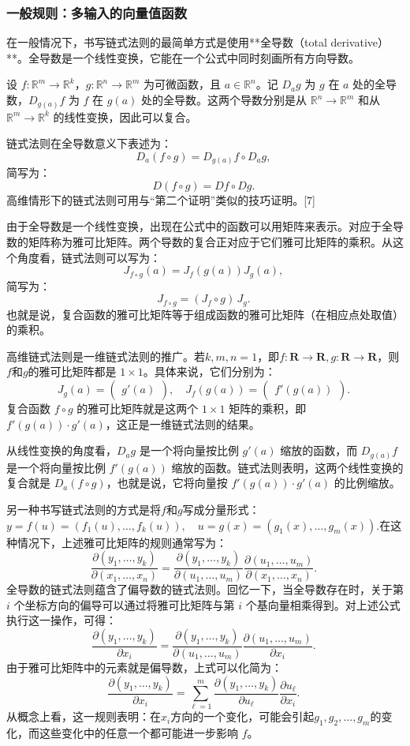 \subsubsection{一般规则：多输入的向量值函数}
在一般情况下，书写链式法则的最简单方式是使用**全导数（total derivative）**。全导数是一个线性变换，它能在一个公式中同时刻画所有方向导数。

设 $f: \mathbb{R}^m \to \mathbb{R}^k$，$g: \mathbb{R}^n \to \mathbb{R}^m$ 为可微函数，且 $a \in \mathbb{R}^n$。记 $D_a g$ 为 $g$ 在 $a$ 处的全导数，$D_{g(a)} f$ 为 $f$ 在 $g(a)$ 处的全导数。这两个导数分别是从 $\mathbb{R}^n \to \mathbb{R}^m$ 和从 $\mathbb{R}^m \to \mathbb{R}^k$ 的线性变换，因此可以复合。

链式法则在全导数意义下表述为：
$$
D_a(f \circ g) = D_{g(a)} f \circ D_a g,~
$$
简写为：
$$
D(f \circ g) = Df \circ Dg.~
$$
高维情形下的链式法则可用与“第二个证明”类似的技巧证明。[7]

由于全导数是一个线性变换，出现在公式中的函数可以用矩阵来表示。对应于全导数的矩阵称为雅可比矩阵。两个导数的复合正对应于它们雅可比矩阵的乘积。从这个角度看，链式法则可以写为：
$$
J_{f \circ g}(a) = J_f(g(a)) J_g(a),~
$$
简写为：
$$
J_{f \circ g} = (J_f \circ g)\, J_g.~
$$
也就是说，复合函数的雅可比矩阵等于组成函数的雅可比矩阵（在相应点处取值）的乘积。

高维链式法则是一维链式法则的推广。若$k, m, n = 1$，即$f : \mathbf{R} \to \mathbf{R}, g : \mathbf{R} \to \mathbf{R}$，则$f$和$g$的雅可比矩阵都是 $1 \times 1$。具体来说，它们分别为：
$$
J_g(a) = \begin{pmatrix} g'(a) \end{pmatrix}, \quad 
J_f(g(a)) = \begin{pmatrix} f'(g(a)) \end{pmatrix}.~
$$
复合函数 $f \circ g$ 的雅可比矩阵就是这两个 $1 \times 1$ 矩阵的乘积，即 $f'(g(a)) \cdot g'(a)$，这正是一维链式法则的结果。

从线性变换的角度看，$D_a g$ 是一个将向量按比例 $g'(a)$ 缩放的函数，而 $D_{g(a)} f$ 是一个将向量按比例 $f'(g(a))$ 缩放的函数。链式法则表明，这两个线性变换的复合就是 $D_a(f \circ g)$，也就是说，它将向量按 $f'(g(a)) \cdot g'(a)$ 的比例缩放。

另一种书写链式法则的方式是将$f$和$g$写成分量形式：$y = f(u) = (f_1(u), \dots, f_k(u)), \quad u = g(x) = (g_1(x), \dots, g_m(x))$.在这种情况下，上述雅可比矩阵的规则通常写为：
$$
\frac{\partial(y_1, \dots, y_k)}{\partial(x_1, \dots, x_n)} 
= \frac{\partial(y_1, \dots, y_k)}{\partial(u_1, \dots, u_m)} 
\frac{\partial(u_1, \dots, u_m)}{\partial(x_1, \dots, x_n)}.~
$$
全导数的链式法则蕴含了偏导数的链式法则。回忆一下，当全导数存在时，关于第 $i$ 个坐标方向的偏导可以通过将雅可比矩阵与第 $i$ 个基向量相乘得到。对上述公式执行这一操作，可得：
$$
\frac{\partial(y_1, \dots, y_k)}{\partial x_i} 
= \frac{\partial(y_1, \dots, y_k)}{\partial(u_1, \dots, u_m)} 
\frac{\partial(u_1, \dots, u_m)}{\partial x_i}.~
$$
由于雅可比矩阵中的元素就是偏导数，上式可以化简为：
$$
\frac{\partial(y_1, \dots, y_k)}{\partial x_i} 
= \sum_{\ell=1}^m \frac{\partial(y_1, \dots, y_k)}{\partial u_\ell} 
\frac{\partial u_\ell}{\partial x_i}.~
$$
从概念上看，这一规则表明：在$x_i$方向的一个变化，可能会引起$g_1, g_2, \dots, g_m$的变化，而这些变化中的任意一个都可能进一步影响 $f$。


